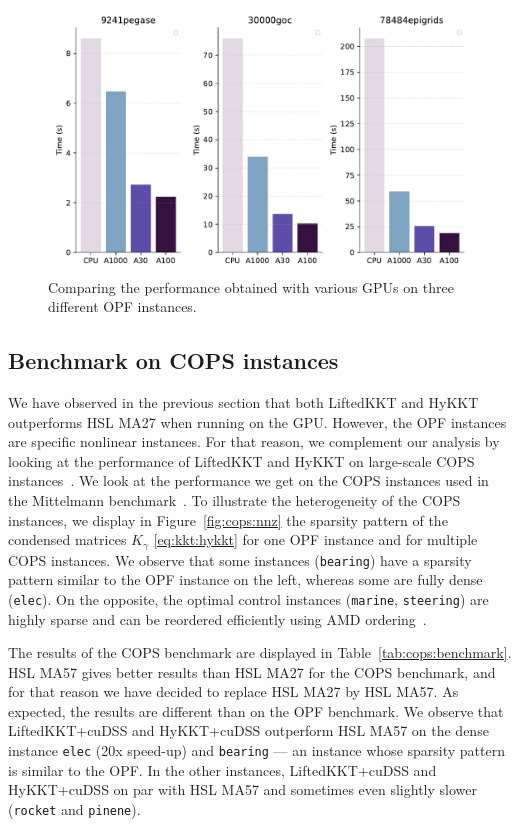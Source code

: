 \begin{figure}[!ht]
  \centering
  \includegraphics[width=.6\textwidth]{../figures/benchmark_gpus.pdf}
  \caption{Comparing the performance obtained with various GPUs
    on three different OPF instances.
  \label{fig:gpubench}}
\end{figure}


\subsection{Benchmark on COPS instances}
\label{sec:num:cops}
We have observed in the previous section that both LiftedKKT
and HyKKT outperforms HSL MA27 when running on the GPU.
However, the OPF instances are specific nonlinear instances.
For that reason, we complement our analysis by looking
at the performance of LiftedKKT and HyKKT on large-scale COPS instances~\cite{dolan2004benchmarking}.
We look at the performance we get on the COPS instances used in
the Mittelmann benchmark~\cite{mittelmann2002benchmark}.
To illustrate the heterogeneity of the COPS instances,
we display in Figure~\ref{fig:cops:nnz} the sparsity pattern of the
condensed matrices $K_\gamma$ \eqref{eq:kkt:hykkt} for one OPF instance and for multiple
COPS instances. We observe that some instances ({\tt bearing}) have a sparsity pattern
similar to the OPF instance on the left, whereas some are fully dense ({\tt elec}).
On the opposite, the optimal control instances ({\tt marine}, {\tt steering}) are
highly sparse and can be reordered efficiently using AMD ordering~\cite{amestoy-david-duff-2004}.

The results of the COPS benchmark are displayed in Table~\ref{tab:cops:benchmark}.
HSL MA57 gives better results than HSL MA27 for the COPS benchmark, and
for that reason we have decided to replace HSL MA27 by HSL MA57. As expected,
the results are different than on the OPF benchmark.
We observe that LiftedKKT+cuDSS and HyKKT+cuDSS outperform HSL MA57 on the dense instance {\tt elec}
(20x speed-up) and {\tt bearing}  --- an instance whose sparsity pattern
is similar to the OPF. In the other instances, LiftedKKT+cuDSS and HyKKT+cuDSS
on par with HSL MA57 and sometimes even slightly slower ({\tt rocket} and {\tt pinene}).


